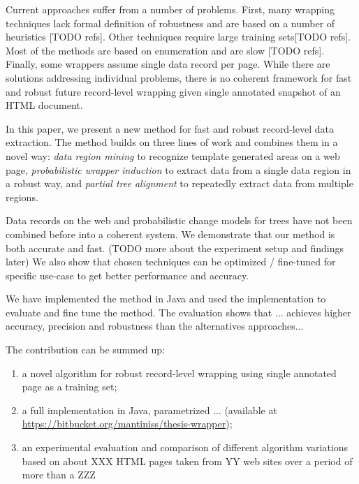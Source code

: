
Current approaches suffer from a number of problems. First, many wrapping techniques lack formal definition of robustness and are based on a number of heuristics [TODO refs]. Other techniques require large training sets[TODO refs]. Most of the methods are based on enumeration and are slow [TODO refs]. Finally, some wrappers assume single data record per page. While there are solutions addressing individual problems, there is no coherent framework for fast and robust future record-level wrapping given single annotated snapshot of an HTML document.

In this paper, we present a new method for fast and robust record-level data extraction. The method builds on three lines of work and combines them in a novel way: \emph{data region mining} \cite{liu2009a} to recognize template generated areas on a web page, \emph{probabilistic wrapper induction} \cite{DBLP:journals/pvldb/ParameswaranDGR11} to extract data from a single data region in a robust way, and \emph{partial tree alignment} \cite{zhai2005a} to repeatedly extract data from multiple regions. 

Data records on the web and probabilistic change models for trees have not been combined before into a coherent system. We demonstrate that our method is both accurate and fast. (TODO more about the experiment setup and findings later) We also show that chosen techniques can be optimized / fine-tuned for specific use-case to get better performance and accuracy.

We have implemented the method in Java and used the implementation to evaluate and fine tune the method. The evaluation shows that ... achieves higher accuracy, precision and robustness than the alternatives approaches...

The contribution can be summed up:

\begin{enumerate}
	\item a novel algorithm for robust record-level wrapping using single annotated page as a training set;
	\item a full implementation in Java, parametrized ... (available at \url{https://bitbucket.org/mantiniss/thesis-wrapper});
	\item an experimental evaluation and comparison of different algorithm variations based on about XXX HTML pages taken from YY web sites over a period of more than a ZZZ 
\end{enumerate}

